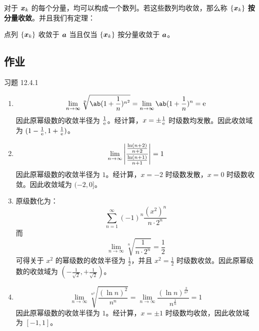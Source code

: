 对于 $\boldsymbol{x}_k$ 的每个分量，均可以构成一个数列。若这些数列均收敛，那么称 $\{\boldsymbol{x}_k\}$ \textbf{按分量收敛}。并且我们有定理：

\begin{theorem}
    点列 $\{\boldsymbol{x}_k\}$ 收敛于 $\boldsymbol{a}$ 当且仅当 $\{\boldsymbol{x}_k\}$ 按分量收敛于 $\boldsymbol{a}$。
\end{theorem}

\subsection{作业}

\begin{problem}
    习题 12.4.1
    \begin{solution}
        \begin{enumerate}
            \item[\textbf{1)}]
            $$
            \lim_{n \to \infty} \sqrt[n]{\ab(1 + \frac{1}{n})^{n^2}} = \lim_{n \to \infty} \ab(1 + \frac{1}{n})^{n} = \E
            $$
            因此原幂级数的收敛半径为 $\frac{1}{\mathrm{e}}$。经计算，$x = \pm\frac{1}{\mathrm{e}}$ 时级数均发散。因此收敛域为 $(1 - \frac{1}{\mathrm{e}}, 1 + \frac{1}{\mathrm{e}})$。

            \item[\textbf{3)}]
            $$
            \lim_{n \to \infty} \abs{\frac{\frac{\ln (n + 2)}{n + 2}}{\frac{\ln (n + 1)}{n + 1}}} = 1
            $$
            因此原幂级数的收敛半径为 $1$。经计算，$x = -2$ 时级数发散，$x = 0$ 时级数收敛。因此收敛域为 $(-2, 0]$。

            \item[\textbf{5)}] 原级数化为：
            $$
            \sum_{n = 1}^{\infty} (-1)^{n} \frac{(x^2)^{n}}{n \cdot 2^{n}}
            $$
            而
            $$
            \lim_{n \to \infty} \sqrt[n]{\frac{1}{n \cdot 2^{n}}} = \frac{1}{2}
            $$
            可得关于 $x^2$ 的幂级数的收敛半径为 $\frac{1}{2}$，并且 $x^2 = \frac{1}{2}$ 时级数收敛。因此原幂级数的收敛域为 $(-\frac{1}{\sqrt{2}}, +\frac{1}{\sqrt{2}})$。

            \item[\textbf{7)}]
            $$
            \lim_{n \to \infty} \sqrt[n^2]{\frac{(\ln n)^2}{n^{n}}} = \lim_{n \to \infty} \frac{(\ln n)^{\frac{2}{n^2}}}{n^{\frac{1}{n}}} = 1
            $$
            因此原幂级数的收敛半径为 $1$。经计算，$x = \pm 1$ 时级数均收敛，因此收敛域为 $[-1, 1]$。
        \end{enumerate}
    \end{solution}
\end{problem}

